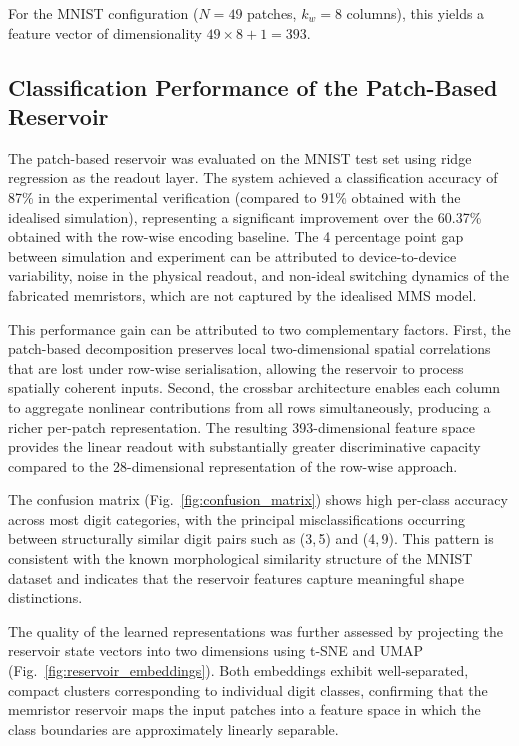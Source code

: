 \documentclass[11pt, oneside]{article}
\begin{document}
\noindent For the MNIST configuration ($N = 49$ patches, $k_w = 8$ columns), this yields a feature vector of dimensionality $49 \times 8 + 1 = 393$.

\subsection{Classification Performance of the Patch-Based Reservoir}

The patch-based reservoir was evaluated on the MNIST test set using ridge regression as the readout layer. The system achieved a classification accuracy of 87\% in the experimental verification (compared to 91\% obtained with the idealised simulation), representing a significant improvement over the 60.37\% obtained with the row-wise encoding baseline. The 4 percentage point gap between simulation and experiment can be attributed to device-to-device variability, noise in the physical readout, and non-ideal switching dynamics of the fabricated memristors, which are not captured by the idealised MMS model.

This performance gain can be attributed to two complementary factors. First, the patch-based decomposition preserves local two-dimensional spatial correlations that are lost under row-wise serialisation, allowing the reservoir to process spatially coherent inputs. Second, the crossbar architecture enables each column to aggregate nonlinear contributions from all rows simultaneously, producing a richer per-patch representation. The resulting 393-dimensional feature space provides the linear readout with substantially greater discriminative capacity compared to the 28-dimensional representation of the row-wise approach.

The confusion matrix (Fig.~\ref{fig:confusion_matrix}) shows high per-class accuracy across most digit categories, with the principal misclassifications occurring between structurally similar digit pairs such as (3,\,5) and (4,\,9). This pattern is consistent with the known morphological similarity structure of the MNIST dataset and indicates that the reservoir features capture meaningful shape distinctions.

The quality of the learned representations was further assessed by projecting the reservoir state vectors into two dimensions using t-SNE and UMAP (Fig.~\ref{fig:reservoir_embeddings}). Both embeddings exhibit well-separated, compact clusters corresponding to individual digit classes, confirming that the memristor reservoir maps the input patches into a feature space in which the class boundaries are approximately linearly separable.
\end{document}
